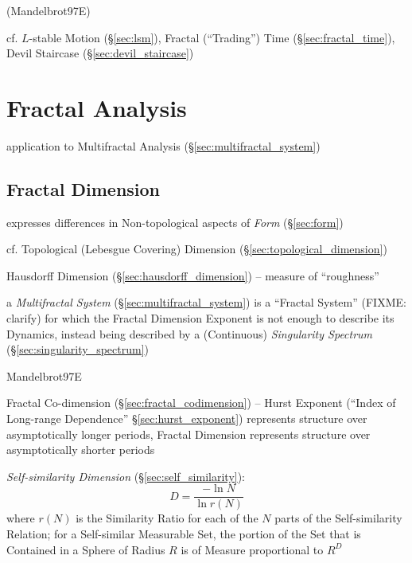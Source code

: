 (Mandelbrot97E)

cf. $L$-stable Motion (\S\ref{sec:lsm}), Fractal (``Trading'') Time
(\S\ref{sec:fractal_time}), Devil Staircase (\S\ref{sec:devil_staircase})



\section{Fractal Analysis}\label{sec:fractal_analysis}

application to Multifractal Analysis (\S\ref{sec:multifractal_system})



\subsection{Fractal Dimension}\label{sec:fractal_dimension}

expresses differences in Non-topological aspects of \emph{Form}
(\S\ref{sec:form})

cf. Topological (Lebesgue Covering) Dimension
(\S\ref{sec:topological_dimension})

Hausdorff Dimension (\S\ref{sec:hausdorff_dimension}) -- measure of
``roughness''

\fist a \emph{Multifractal System} (\S\ref{sec:multifractal_system}) is a
``Fractal System'' (FIXME: clarify) for which the Fractal Dimension Exponent is
not enough to describe its Dynamics, instead being described by a (Continuous)
\emph{Singularity Spectrum} (\S\ref{sec:singularity_spectrum})

Mandelbrot97E

Fractal Co-dimension (\S\ref{sec:fractal_codimension}) --
Hurst Exponent (``Index of Long-range Dependence'' \S\ref{sec:hurst_exponent})
represents structure over asymptotically longer periods, Fractal Dimension
represents structure over asymptotically shorter periods

\emph{Self-similarity Dimension} (\S\ref{sec:self_similarity}):
\[
  D = \frac{-\ln N}{\ln r(N)}
\]
where $r(N)$ is the Similarity Ratio for each of the $N$ parts of the
Self-similarity Relation;
for a Self-similar Measurable Set, the portion of the Set that is Contained in a
Sphere of Radius $R$ is of Measure proportional to $R^D$

